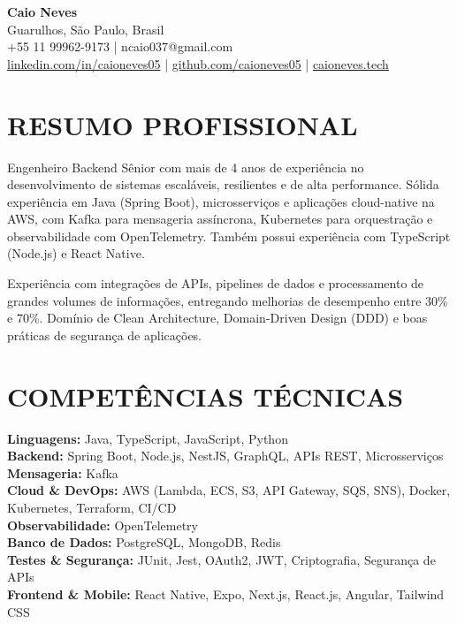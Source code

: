 \documentclass[10pt,letterpaper]{article}
\begin{document}
\begin{center}
    \textbf{\large Caio Neves} \\
    Guarulhos, São Paulo, Brasil \\
    +55 11 99962-9173 \;|\; ncaio037@gmail.com \\
    \href{https://www.linkedin.com/in/caioneves05}{linkedin.com/in/caioneves05} \;|\;
    \href{https://github.com/caioneves05}{github.com/caioneves05} \;|\;
    \href{http://caioneves.tech}{caioneves.tech}
\end{center}

\section{RESUMO PROFISSIONAL}
Engenheiro Backend Sênior com mais de 4 anos de experiência no desenvolvimento de sistemas escaláveis, resilientes e de alta performance. Sólida experiência em Java (Spring Boot), microsserviços e aplicações cloud-native na AWS, com Kafka para mensageria assíncrona, Kubernetes para orquestração e observabilidade com OpenTelemetry. Também possui experiência com TypeScript (Node.js) e React Native.

Experiência com integrações de APIs, pipelines de dados e processamento de grandes volumes de informações, entregando melhorias de desempenho entre 30\% e 70\%. Domínio de Clean Architecture, Domain-Driven Design (DDD) e boas práticas de segurança de aplicações.

\section{COMPETÊNCIAS TÉCNICAS}
\textbf{Linguagens:} Java, TypeScript, JavaScript, Python \\
\textbf{Backend:} Spring Boot, Node.js, NestJS, GraphQL, APIs REST, Microsserviços \\
\textbf{Mensageria:} Kafka \\
\textbf{Cloud \& DevOps:} AWS (Lambda, ECS, S3, API Gateway, SQS, SNS), Docker, Kubernetes, Terraform, CI/CD \\
\textbf{Observabilidade:} OpenTelemetry \\
\textbf{Banco de Dados:} PostgreSQL, MongoDB, Redis \\
\textbf{Testes \& Segurança:} JUnit, Jest, OAuth2, JWT, Criptografia, Segurança de APIs \\
\textbf{Frontend \& Mobile:} React Native, Expo, Next.js, React.js, Angular, Tailwind CSS
\end{document}
